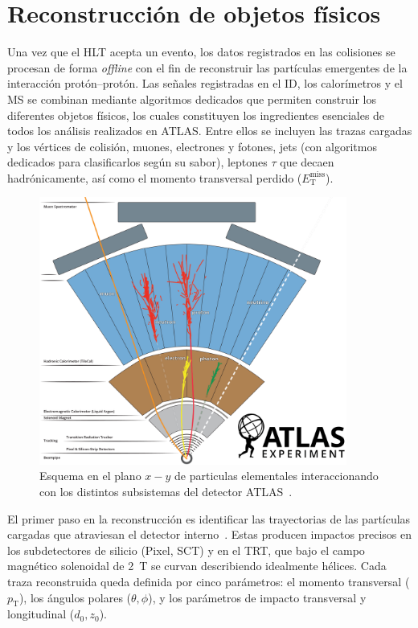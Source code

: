 \section*{Reconstrucción de objetos físicos}

Una vez que el HLT acepta un evento, los datos registrados en las colisiones se procesan de forma \textit{offline} con el fin de reconstruir las partículas emergentes de la interacción protón–protón. Las señales registradas en el ID, los calorímetros y el MS se combinan mediante algoritmos dedicados que permiten construir los diferentes objetos físicos, los cuales constituyen los ingredientes esenciales de todos los análisis realizados en ATLAS. Entre ellos se incluyen las trazas cargadas y los vértices de colisión, muones, electrones y fotones, jets (con algoritmos dedicados para clasificarlos según su sabor), leptones $\tau$ que decaen hadrónicamente, así como el momento transversal perdido ($E_{\mathrm{T}}^{\text{miss}}$).  

\begin{figure}[h]
  \centering
  \includegraphics[width=0.9\textwidth]{images/atlas_particles.png}
  \caption{Esquema en el plano $x-y$ de particulas elementales interaccionando con los distintos subsistemas del detector ATLAS~\cite{Bianchi:2837191}.}
  \label{res:reco}
 \end{figure}

El primer paso en la reconstrucción es identificar las trayectorias de las partículas cargadas que atraviesan el detector interno~\cite{tracks}. Estas producen impactos precisos en los subdetectores de silicio (Pixel, SCT) y en el TRT, que bajo el campo magnético solenoidal de 2~T se curvan describiendo idealmente hélices. Cada traza reconstruida queda definida por cinco parámetros: el momento transversal ($p_{\mathrm{T}}$), los ángulos polares ($\theta, \phi$), y los parámetros de impacto transversal y longitudinal ($d_{0}, z_{0}$).  


